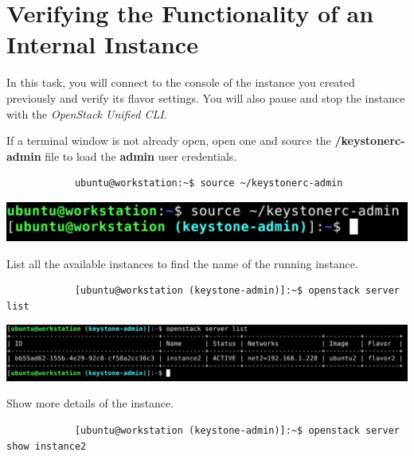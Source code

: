 \documentclass[letterpaper, 12pt]{article}
\begin{document}
\section{Verifying the Functionality of an Internal Instance}\label{sec:verifying-the-functionality-of-an-internal-instance}
In this task, you will connect to the console of the instance you created previously and verify its flavor settings.
You will also pause and stop the instance with the \textit{OpenStack Unified CLI}.

\begin{enumerate}
    \begin{labstep}
        If a terminal window is not already open, open one and source the \textbf{\texttildemid/keystonerc-admin} file to load the \textbf{admin} user credentials.
        \begin{lstlisting}
            ubuntu@workstation:~$ source ~/keystonerc-admin
        \end{lstlisting}

        \begin{center}
            \includegraphics[width=\linewidth]{images/part5/step1.png}
        \end{center}
    \end{labstep}

    \begin{labstep}
        List all the available instances to find the name of the running instance.
        \begin{lstlisting}
            [ubuntu@workstation (keystone-admin)]:~$ openstack server list
        \end{lstlisting}

        \begin{center}
            \includegraphics[width=\linewidth]{images/part5/step2.png}
        \end{center}
    \end{labstep}

    \begin{labstep}
        Show more details of the instance.
        \begin{lstlisting}
            [ubuntu@workstation (keystone-admin)]:~$ openstack server show instance2
        \end{lstlisting}


\end{labstep}
\end{enumerate}
\end{document}
